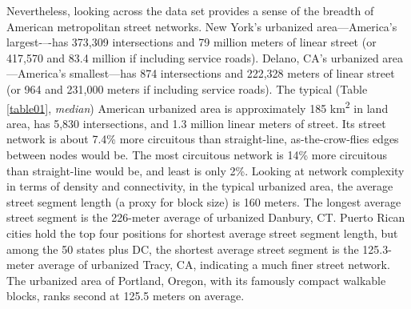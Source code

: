 \documentclass{article}
\begin{document}
Nevertheless, looking across the data set provides a sense of the breadth of American metropolitan street networks. New York's urbanized area---America's largest-–-has 373,309 intersections and 79 million meters of linear street (or 417,570 and 83.4 million if including service roads). Delano, CA's urbanized area---America's smallest---has 874 intersections and 222,328 meters of linear street (or 964 and 231,000 meters if including service roads). The typical (Table \ref{table01}, \emph{median}) American urbanized area is approximately 185 km\textsuperscript{2} in land area, has 5,830 intersections, and 1.3 million linear meters of street. Its street network is about 7.4\% more circuitous than straight-line, as-the-crow-flies edges between nodes would be. The most circuitous network is 14\% more circuitous than straight-line would be, and least is only 2\%. Looking at network complexity in terms of density and connectivity, in the typical urbanized area, the average street segment length (a proxy for block size) is 160 meters. The longest average street segment is the 226-meter average of urbanized Danbury, CT. Puerto Rican cities hold the top four positions for shortest average street segment length, but among the 50 states plus DC, the shortest average street segment is the 125.3-meter average of urbanized Tracy, CA, indicating a much finer street network. The urbanized area of Portland, Oregon, with its famously compact walkable blocks, ranks second at 125.5 meters on average.
\end{document}
